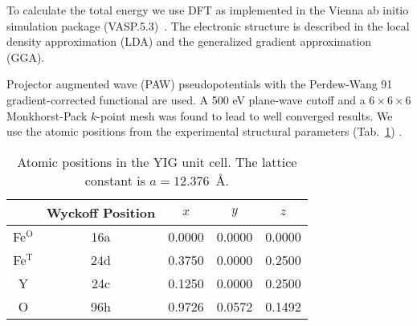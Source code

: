 \documentclass[aps,pre,reprint,superscriptaddress,longbibliography]{revtex4-1}
\begin{document}
To calculate the total energy  we use DFT as implemented in the Vienna ab initio simulation package (VASP.5.3)~\cite{kresse1993ab,kresse1996efficient}. The electronic structure is described in the local density approximation (LDA) and the generalized gradient approximation (GGA). {Projector augmented wave (PAW) pseudopotentials \cite{blochl1994projector} with the Perdew-Wang 91 gradient-corrected functional are used. A 500 eV plane-wave cutoff and a $6\times6\times6$ Monkhorst-Pack $k$-point mesh was found to lead to well converged results. We use the atomic positions from the experimental structural parameters (Tab.~\ref{tab:stru}) \cite{Geller1957,Geller1959}. 

\begin{table}[h]
\begin{ruledtabular}
\begin{center}
\begin{tabular}{ccccc}
         & Wyckoff Position  & $x$ & $y$ & $z$ \\
\hline
     Fe$^{\mathrm{O}}$  & 16a  & 0.0000 & 0.0000 &0.0000 \\
     Fe$^{\mathrm{T}}$  & 24d  & 0.3750 & 0.0000 & 0.2500 \\
     Y & 24c  & 0.1250 & 0.0000 & 0.2500 \\
     O & 96h  & 0.9726 & 0.0572 & 0.1492 \\
\end{tabular}
\caption{Atomic positions in the YIG unit cell. The lattice constant is $a=12.376$~\AA.}
\label{tab:stru}
\end{center} 
\end{ruledtabular}
\end{table}


}
\end{document}
